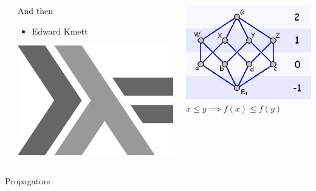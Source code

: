 \documentclass[usenames,dvipsnames,svgnames,table,aspectratio=1610,mathserif]{beamer}
\newcommand{\nl}{\vspace{\baselineskip}}
\begin{document}
\begin{frame}
\begin{columns}
\begin{column}{0.005\textwidth}
\end{column}
\begin{column}{0.4\textwidth}
And then
\begin{itemize}
\item Edward Kmett
\end{itemize}
\nl
\nl
\includegraphics[scale=0.2]{haskell.png}
\end{column}
\begin{column}{0.5\textwidth}
\includegraphics[scale=0.4]{hasse.png}
\nl
\nl
{\LARGE
  $x \le y \implies f(x) \le f(y)$
}
\end{column}
\end{columns}
\end{frame}




\begin{frame}

\begin{center}
{\Huge Propagators}
\end{center}

\end{frame}
\end{document}
